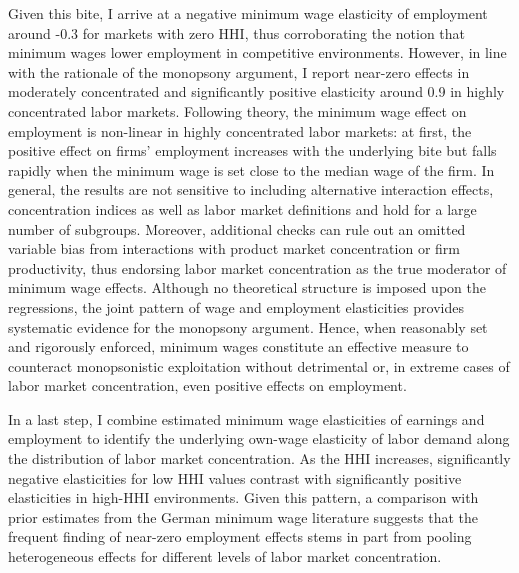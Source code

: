 \documentclass[11pt,oneside,reqno,xcolor=dvipsnames]{article} %
\begin{document}

Given this bite, I arrive at a negative minimum wage elasticity of employment around -0.3 for markets with zero HHI, thus corroborating the notion that minimum wages lower employment in competitive environments. However, in line with the rationale of the monopsony argument, I report near-zero effects in moderately concentrated and significantly positive elasticity around 0.9 in highly concentrated labor markets. Following theory, the minimum wage effect on employment is non-linear in highly concentrated labor markets: at first, the positive effect on firms' employment increases with the underlying bite but falls rapidly when the minimum wage is set close to the median wage of the firm. In general, the results are not sensitive to including alternative interaction effects, concentration indices as well as labor market definitions and hold for a large number of subgroups. Moreover, additional checks can rule out an omitted variable bias from interactions with product market concentration or firm productivity, thus endorsing labor market concentration as the true moderator of minimum wage effects. Although no theoretical structure is imposed upon the regressions, the joint pattern of wage and employment elasticities provides systematic evidence for the monopsony argument. Hence, when reasonably set and rigorously enforced, minimum wages constitute an effective measure to counteract monopsonistic exploitation without detrimental or, in extreme cases of labor market concentration, even positive effects on employment.


In a last step, I combine estimated minimum wage elasticities of earnings and employment to identify the underlying own-wage elasticity of labor demand along the distribution of labor market concentration. As the HHI increases, significantly negative elasticities for low HHI values contrast with significantly positive elasticities in high-HHI environments. Given this pattern, a comparison with prior estimates from the German minimum wage literature suggests that the frequent finding of near-zero employment effects stems in part from pooling heterogeneous effects for different levels of labor market concentration.
\end{document}
